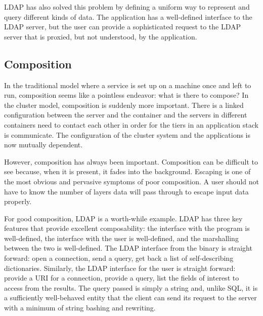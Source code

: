 \documentclass[letterpaper,twocolumn,10pt]{article}
\begin{document}
LDAP has also solved this problem by defining a uniform way to represent and query different kinds of data. The application has a well-defined interface to the LDAP server, but the user can provide a sophisticated request to the LDAP server that is proxied, but not understood, by the application.

\subsection{Composition}
In the traditional model where a service is set up on a machine once and left to run, composition seems like a pointless endeavor: what is there to compose? In the cluster model, composition is suddenly more important. There is a linked configuration between the server and the container and the servers in different containers need to contact each other in order for the tiers in an application stack is communicate. The configuration of the cluster system and the applications is now mutually dependent.

However, composition has always been important. Composition can be difficult to see because, when it is present, it fades into the background. Escaping is one of the most obvious and pervasive symptoms of poor composition. A user should not have to know the number of layers data will pass through to escape input data properly.

For good composition, LDAP is a worth-while example. LDAP has three key features that provide excellent composability: the interface with the program is well-defined, the interface with the user is well-defined, and the marshalling between the two is well-defined. The LDAP interface from the binary is straight forward: open a connection, send a query, get back a list of self-describing dictionaries. Similarly, the LDAP interface for the user is straight forward: provide a URI for a connection, provide a query, list the fields of interest to access from the results. The query passed is simply a string and, unlike SQL, it is a sufficiently well-behaved entity that the client can send its request to the server with a minimum of string bashing and rewriting.
\end{document}
